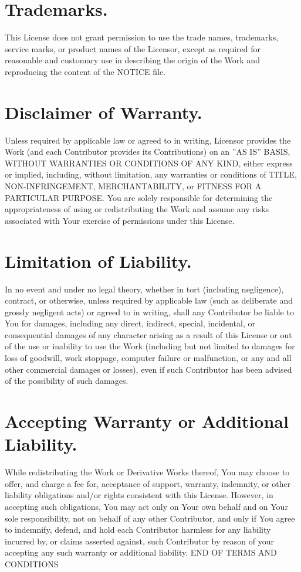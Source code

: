 \documentclass[a4paper, 12pt]{article}
\begin{document}
\section{Trademarks.}

This License does not grant permission to use the trade names, trademarks, service marks, or product names of the Licensor, except as required for reasonable and customary use in describing the origin of the Work and reproducing the content of the NOTICE file.

\section{Disclaimer of Warranty.}

Unless required by applicable law or agreed to in writing, Licensor provides the Work (and each Contributor provides its Contributions) on an ''AS IS'' BASIS, WITHOUT WARRANTIES OR CONDITIONS OF ANY KIND, either express or implied, including, without limitation, any warranties or conditions of TITLE, NON-INFRINGEMENT, MERCHANTABILITY, or FITNESS FOR A PARTICULAR PURPOSE. You are solely responsible for determining the appropriateness of using or redistributing the Work and assume any risks associated with Your exercise of permissions under this License.

\section{Limitation of Liability.}

In no event and under no legal theory, whether in tort (including negligence), contract, or otherwise, unless required by applicable law (such as deliberate and grossly negligent acts) or agreed to in writing, shall any Contributor be liable to You for damages, including any direct, indirect, special, incidental, or consequential damages of any character arising as a result of this License or out of the use or inability to use the Work (including but not limited to damages for loss of goodwill, work stoppage, computer failure or malfunction, or any and all other commercial damages or losses), even if such Contributor has been advised of the possibility of such damages.

\section{Accepting Warranty or Additional Liability.}

While redistributing the Work or Derivative Works thereof, You may choose to offer, and charge a fee for, acceptance of support, warranty, indemnity, or other liability obligations and/or rights consistent with this License. However, in accepting such obligations, You may act only on Your own behalf and on Your sole responsibility, not on behalf of any other Contributor, and only if You agree to indemnify, defend, and hold each Contributor harmless for any liability incurred by, or claims asserted against, such Contributor by reason of your accepting any such warranty or additional liability. END OF TERMS AND CONDITIONS
\end{document}
